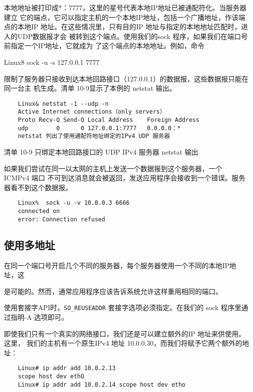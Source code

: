 本地地址被打印成*：7777，这里的星号代表本地IP地址已被通配符化。当服务器建立
它的端点，它可以指定主机的一个本地IP地址，包括一个广播地址，作该端点的本地IP
地址。在这些情况里，只有目的IP 地址与指定的本地地址匹配时，进人的UDP数据报才会
被转到这个端点。使用我们的sock 程序，如果我们在端口号前指定一个IP地址，它就成为
了这个端点的本地地址。例如，命令

Linux8 sock -u -s 127.0.0.1 7777

限制了服务器只接收到达本地回路接口（127.0.0.1）的数据报，这些数据报只能在同一台主
机生成。清单 10-9显示了本例的 netstat 输出。

\begin{verbatim}
    Linux& netstat -1 --udp -n
    Active Internet connections（only servers）
    Proto Recv-Q Send-Q Local Address    Foreign Address
    udp        0      0 127.0.0.1:7777   0.0.0.0：*
    netstat 列出了使用通配符地址绑定的IPv4 UDP 服务器
\end{verbatim}
清单 10-9 只绑定本地回路接口的 UDP IPv4 服务器 netstat 输出

如果我们尝试在同一以太网的主机上发送一个数据报到这个服务器，一个 ICMPv4 端口
不可到达消息就会被返回，发送应用程序会接收到一个错误。服务器看不到这个数据报。

\begin{verbatim}
    Linux%  sock -u -v 10.0.0.3 6666
    connected on
    error: Connection refused
\end{verbatim}

\subsection{使用多地址}
在同一个端口号开启几个不同的服务器，每个服务器使用一个不同的本地IP地址，这

是可能的。然而，通常应用程序应该告诉系统允许这样重用相同的端口。


\begin{tcolorbox}
使用套接字API时，\verb|SO_REUSEADDR| 套接字选项必须指定。在我们的
sock 程序里通过指明-A 选项即可。
\end{tcolorbox}

即使我们只有一个真实的网络接口，我们还是可以建立额外的IP 地址来供使用。这里，
我们的主机有一个原生IPv4 地址 10.0.0.30，而我们将赋予它两个额外的地址：

\begin{verbatim}
    Linux# ip addr add 10.0.2.13
    scope host dev ethO
    Linux# ip addr add 10.0.2.14 scope host dev etho
\end{verbatim}

